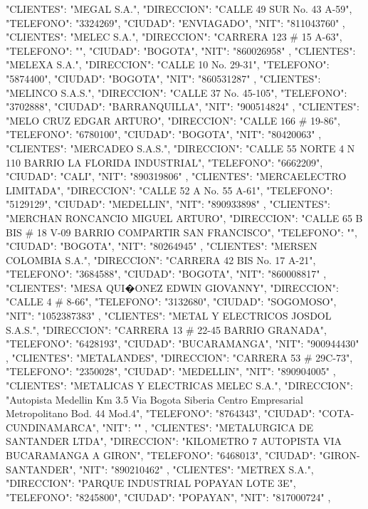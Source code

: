    {
   "CLIENTES": "MEGAL S.A.",
   "DIRECCION": "CALLE 49 SUR No. 43 A-59",
   "TELEFONO": "3324269",
   "CIUDAD": "ENVIAGADO",
   "NIT": "811043760"
   },
   {
   "CLIENTES": "MELEC S.A.",
   "DIRECCION": "CARRERA 123 # 15 A-63",
   "TELEFONO": "",
   "CIUDAD": "BOGOTA",
   "NIT": "860026958"
   },
   {
   "CLIENTES": "MELEXA S.A.",
   "DIRECCION": "CALLE 10 No. 29-31",
   "TELEFONO": "5874400",
   "CIUDAD": "BOGOTA",
   "NIT": "860531287"
   },
   {
   "CLIENTES": "MELINCO S.A.S.",
   "DIRECCION": "CALLE 37 No. 45-105",
   "TELEFONO": "3702888",
   "CIUDAD": "BARRANQUILLA",
   "NIT": "900514824"
   },
   {
   "CLIENTES": "MELO CRUZ EDGAR ARTURO",
   "DIRECCION": "CALLE 166 # 19-86",
   "TELEFONO": "6780100",
   "CIUDAD": "BOGOTA",
   "NIT": "80420063"
   },
   {
   "CLIENTES": "MERCADEO S.A.S.",
   "DIRECCION": "CALLE 55 NORTE 4 N 110 BARRIO LA FLORIDA INDUSTRIAL",
   "TELEFONO": "6662209",
   "CIUDAD": "CALI",
   "NIT": "890319806"
   },
   {
   "CLIENTES": "MERCAELECTRO LIMITADA",
   "DIRECCION": "CALLE 52 A No. 55 A-61",
   "TELEFONO": "5129129",
   "CIUDAD": "MEDELLIN",
   "NIT": "890933898"
   },
   {
   "CLIENTES": "MERCHAN RONCANCIO MIGUEL ARTURO",
   "DIRECCION": "CALLE 65 B BIS # 18 V-09 BARRIO COMPARTIR SAN FRANCISCO",
   "TELEFONO": "",
   "CIUDAD": "BOGOTA",
   "NIT": "80264945"
   },
   {
   "CLIENTES": "MERSEN COLOMBIA S.A.",
   "DIRECCION": "CARRERA 42 BIS No. 17 A-21",
   "TELEFONO": "3684588",
   "CIUDAD": "BOGOTA",
   "NIT": "860008817"
   },
   {
   "CLIENTES": "MESA QUI�ONEZ EDWIN GIOVANNY",
   "DIRECCION": "CALLE 4 # 8-66",
   "TELEFONO": "3132680",
   "CIUDAD": "SOGOMOSO",
   "NIT": "1052387383"
   },
   {
   "CLIENTES": "METAL Y ELECTRICOS JOSDOL S.A.S.",
   "DIRECCION": "CARRERA 13 # 22-45 BARRIO GRANADA",
   "TELEFONO": "6428193",
   "CIUDAD": "BUCARAMANGA",
   "NIT": "900944430"
   },
   {
   "CLIENTES": "METALANDES",
   "DIRECCION": "CARRERA 53 # 29C-73",
   "TELEFONO": "2350028",
   "CIUDAD": "MEDELLIN",
   "NIT": "890904005"
   },
   {
   "CLIENTES": "METALICAS Y ELECTRICAS MELEC S.A.",
   "DIRECCION": "Autopista Medellin Km 3.5 Via Bogota Siberia Centro Empresarial Metropolitano Bod. 44 Mod.4",
   "TELEFONO": "8764343",
   "CIUDAD": "COTA-CUNDINAMARCA",
   "NIT": ""
   },
   {
   "CLIENTES": "METALURGICA DE SANTANDER LTDA",
   "DIRECCION": "KILOMETRO 7 AUTOPISTA VIA BUCARAMANGA A GIRON",
   "TELEFONO": "6468013",
   "CIUDAD": "GIRON-SANTANDER",
   "NIT": "890210462"
   },
   {
   "CLIENTES": "METREX S.A.",
   "DIRECCION": "PARQUE INDUSTRIAL POPAYAN LOTE 3E",
   "TELEFONO": "8245800",
   "CIUDAD": "POPAYAN",
   "NIT": "817000724"
   },
